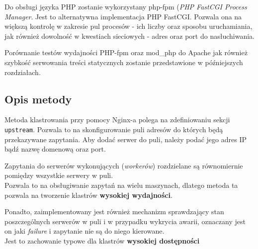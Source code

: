 {Do obsługi języka PHP zostanie wykorzystany php-fpm (\textit{PHP FastCGI Process Manager}.
Jest to alternatywna implementacja PHP FastCGI.
Pozwala ona na większą kontrolę w zakresie pul procesów - ich liczby oraz sposobu uruchamiania, jak również dowolność w kwestiach sieciowych - adres oraz port do nasłuchiwania.

Porównanie testów wydajności PHP-fpm oraz mod_php do Apache jak również szybkość serwowania treści statycznych zostanie przedstawione w późniejszych rozdziałach.
\subsection{Opis metody}
Metoda klastrowania przy pomocy Nginx-a polega na zdefiniowaniu sekcji \texttt{upstream}.
Pozwala to na skonfigurowanie puli adresów do których będą przekazywane zapytania.
Aby dodać serwer do puli, należy podać jego adres IP bądź nazwę domenową oraz port.

Zapytania do serwerów wykonujących (\textit{workerów}) rozdzielane są równomiernie pomiędzy wszystkie serwery w puli.\\
Pozwala to na obsługiwanie zapytań na wielu maszynach, dlatego metoda ta pozwala na tworzenie klastrów \textbf{wysokiej wydajności}.

Ponadto, zaimplementowany jest również mechanizm sprawdzający stan poszczególnych serwerów w puli i w przypadku wykrycia awarii, oznaczany jest on jaki \textit{failure} i zapytanie nie są do niego kierowane.\\
Jest to zachowanie typowe dla klastrów \textbf{wysokiej dostępności}

}
